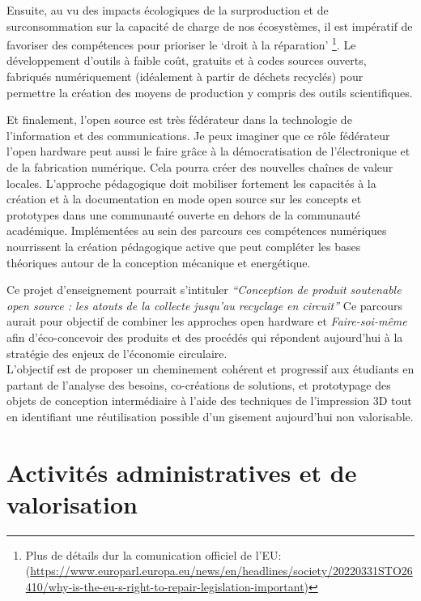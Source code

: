 \documentclass[
  12pt,
  oneside]{book}
\begin{document}
Ensuite, au vu des impacts écologiques de la surproduction et de surconsommation sur la capacité de charge de nos écosystèmes, il est impératif de favoriser des compétences pour prioriser le `droit à la réparation' \footnote{Plus de détails dur la comunication officiel de l'EU: (\url{https://www.europarl.europa.eu/news/en/headlines/society/20220331STO26410/why-is-the-eu-s-right-to-repair-legislation-important})}.
Le développement d'outils à faible coût, gratuits et à codes sources ouverts, fabriqués numériquement (idéalement à partir de déchets recyclés) pour permettre la création des moyens de production y compris des outils scientifiques.

Et finalement, l'open source est très fédérateur dans la technologie de l'information et des communications. Je peux imaginer que ce rôle fédérateur l'open hardware peut aussi le faire grâce à la démocratisation de l'électronique et de la fabrication numérique.
Cela pourra créer des nouvelles chaînes de valeur locales. L'approche pédagogique doit mobiliser fortement les capacités à la création et à la documentation en mode open source sur les concepts et prototypes dans une communauté ouverte en dehors de la communauté académique. Implémentées au sein des parcours ces compétences numériques nourrissent la création pédagogique active que peut compléter les bases théoriques autour de la conception mécanique et energétique.

Ce projet d'enseignement pourrait s'intituler \emph{``Conception de produit soutenable open source : les atouts de la collecte jusqu'au recyclage en circuit''}
Ce parcours aurait pour objectif de combiner les approches open hardware et \emph{Faire-soi-même} afin d'éco-concevoir des produits et des procédés qui répondent aujourd'hui à la stratégie des enjeux de l'économie circulaire.\\
L'objectif est de proposer un cheminement cohérent et progressif aux étudiants en partant de l'analyse des besoins, co-créations de solutions, et prototypage des objets de conception intermédiaire à l'aide des techniques de l'impression 3D tout en identifiant une réutilisation possible d'un gisement aujourd'hui non valorisable.

\hypertarget{activituxe9s-administratives-et-de-valorisation}{%
\chapter{Activités administratives et de valorisation}\label{activituxe9s-administratives-et-de-valorisation}}
\end{document}

